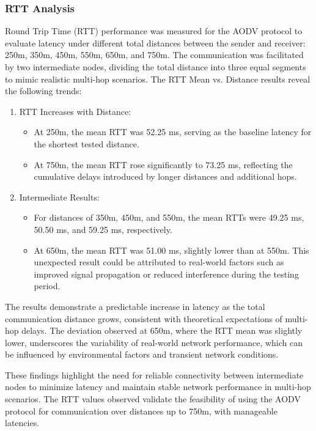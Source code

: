 \documentclass[]{nsm-thesis}
\begin{document}
\subsubsection{RTT Analysis}
Round Trip Time (RTT) performance was measured for the AODV protocol to evaluate latency under different total distances between the sender and receiver: 250m, 350m, 450m, 550m, 650m, and 750m. The communication was facilitated by two intermediate nodes, dividing the total distance into three equal segments to mimic realistic multi-hop scenarios.
The RTT Mean vs. Distance results reveal the following trends:
\begin{enumerate}
    \item RTT Increases with Distance:
       \begin{itemize}
           \item At 250m, the mean RTT was 52.25 ms, serving as the baseline latency for the shortest tested distance.
           \item At 750m, the mean RTT rose significantly to 73.25 ms, reflecting the cumulative delays introduced by longer distances and additional hops.
       \end{itemize}
    \item Intermediate Results:
      \begin{itemize}
          \item For distances of 350m, 450m, and 550m, the mean RTTs were 49.25 ms, 50.50 ms, and 59.25 ms, respectively.

          \item At 650m, the mean RTT was 51.00 ms, slightly lower than at 550m. This unexpected result could be attributed to real-world factors such as improved signal propagation or reduced interference during the testing period.
      \end{itemize}
\end{enumerate}

The results demonstrate a predictable increase in latency as the total communication distance grows, consistent with theoretical expectations of multi-hop delays. The deviation observed at 650m, where the RTT mean was slightly lower, underscores the variability of real-world network performance, which can be influenced by environmental factors and transient network conditions.

These findings highlight the need for reliable connectivity between intermediate nodes to minimize latency and maintain stable network performance in multi-hop scenarios. The RTT values observed validate the feasibility of using the AODV protocol for communication over distances up to 750m, with manageable latencies.
\end{document}
